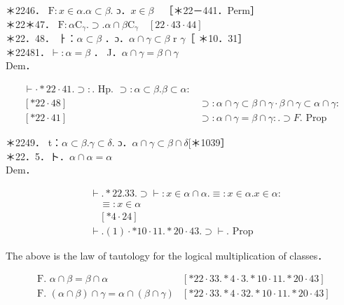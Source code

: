 \documentclass[10pt]{article}
\begin{document}
＊2246． $\mathrm{F}: x \in \alpha . \alpha \subset \beta$. ɔ．$x \in \beta \quad$［＊22－441．Perm］\\
＊22＊47． $\mathrm{F}: \alpha \mathrm{C}_{\gamma} . \supset . \alpha \cap \beta \mathrm{C}_{\gamma} \quad[22 \cdot 43 \cdot 44]$\\
＊22．48． ㅏ：$\alpha \subset \beta$ ．ɔ．$\alpha \cap \gamma \subset \beta$ r $\gamma$［ ＊10．31］\\
＊22481．$\vdash: \alpha=\beta$ ． J．$\alpha \cap \gamma=\beta \cap \gamma$\\
Dem．

$$
\begin{array}{ll}
\vdash \cdot * 22 \cdot 41 . \supset: . \text { Hp. } \supset: \alpha \subset \beta . \beta \subset \alpha: \\
{[* 22 \cdot 48]} & \supset: \alpha \cap \gamma \subset \beta \cap \gamma \cdot \beta \cap \gamma \subset \alpha \cap \gamma: \\
{[* 22 \cdot 41]} & \supset: \alpha \cap \gamma=\beta \cap \gamma: . \supset F . \text { Prop }
\end{array}
$$

＊2249． t：$\alpha \subset \beta . \gamma \subset \delta$. ɔ．$\alpha \cap \gamma \subset \beta \cap \delta[$＊1039］\\
＊22．5．ト．$\alpha \cap \alpha=\alpha$\\
Dem．


\begin{align*}
& \vdash . * 22.33 . \supset \vdash: x \in \alpha \cap \alpha . \equiv: x \in \alpha . x \in \alpha: \\
& \quad \equiv: x \in \alpha  \tag{1}\\
& \quad[* 4 \cdot 24] \\
& \vdash .(1) \cdot * 10 \cdot 11 . * 20 \cdot 43 . \supset \vdash . \text { Prop }
\end{align*}


The above is the law of tautology for the logical multiplication of classes．

\[
\begin{array}{ll}
\text { F. } \alpha \cap \beta=\beta \cap \alpha & {[* 22 \cdot 33 . * 4 \cdot 3 . * 10 \cdot 11 . * 20 \cdot 43]}  \tag{$* 22.51$.}\\
\text { F. }(\alpha \cap \beta) \cap \gamma=\alpha \cap(\beta \cap \gamma) & {[* 22 \cdot 33 . * 4 \cdot 32 . * 10 \cdot 11 . * 20 \cdot 43]}
\end{array}
\]
\end{document}
